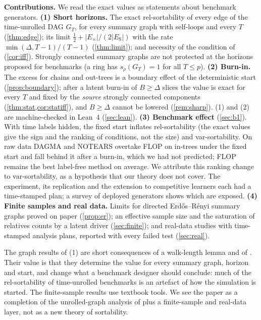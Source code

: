 \documentclass{article}
\theoremstyle{plain}
\theoremstyle{definition}
\theoremstyle{remark}
\newcommand{\Es}{E_{\mathrm S}}
\newcommand{\Ex}{E_{\times}}
\newcommand{\GT}{G_T}
\newcommand{\srho}{s_\rho}
\begin{document}
\textbf{Contributions.} We read the exact values as statements about
benchmark generators.
\textbf{(1) Short horizons.} The exact rel-sortability of every edge of the
time-unrolled DAG $\GT$, for every summary graph with self-loops and every $T$
(\cref{thm:edge}); its limit $\tfrac12+|\Ex|/(2|\Es|)$ with the rate
$\min(\Delta,T{-}1)/(T{-}1)$ (\cref{thm:limit}); and necessity of the condition of
\citet[Thm.~4]{reisach2026topological} (\cref{cor:iff}). Strongly connected
summary graphs are not protected at the horizons proposed for benchmarks (a
ring has $\srho(\GT)=1$ for all $T\le p$).
\textbf{(2) Burn-in.} The excess for chains and out-trees is a boundary effect
of the deterministic start (\cref{prop:boundary}); after a latent burn-in of
$B\ge\Delta$ slices the value is exact for every $T$ and fixed by the
\emph{source} strongly connected components (\cref{thm:stat,cor:statiff}), and
$B\ge\Delta$ cannot be lowered (\cref{rem:sharp}). (1) and (2) are
machine-checked in Lean~4 (\cref{sec:lean}).
\textbf{(3) Benchmark effect} (\cref{sec:b1}). With time labels hidden, the
fixed start inflates rel-sortability (the exact values give the sign and the
ranking of conditions, not the size) and var-sortability. On raw data DAGMA
and NOTEARS overtake FLOP on in-trees under the fixed start and fall behind it
after a burn-in, which we had not predicted; FLOP remains the best label-free
method on average. We attribute this ranking change to var-sortability, as a
hypothesis that our theory does not cover. The experiment, its replication and
the extension to competitive learners each had a time-stamped plan; a survey
of deployed generators shows which are exposed.
\textbf{(4) Finite samples and real data.} Limits for directed
Erd\H{o}s--R\'enyi summary graphs proved on paper (\cref{prop:er}); an
effective sample size and the saturation of relatives counts by a latent
driver (\cref{sec:finite}); and real-data studies with time-stamped analysis
plans, reported with every failed test (\cref{sec:real}).

The graph results of (1) are short consequences of a walk-length lemma and of
\citet[Lemma~1]{reisach2026topological}. Their value is that they determine
the value for every summary graph, horizon and start, and change what a
benchmark designer should conclude: much of the rel-sortability of
time-unrolled benchmarks is an artefact of how the simulation is started. The
finite-sample results use textbook tools. We see the paper as a completion of
the unrolled-graph analysis of \citet[Section~5]{reisach2026topological} plus
a finite-sample and real-data layer, not as a new theory of sortability.
\end{document}
